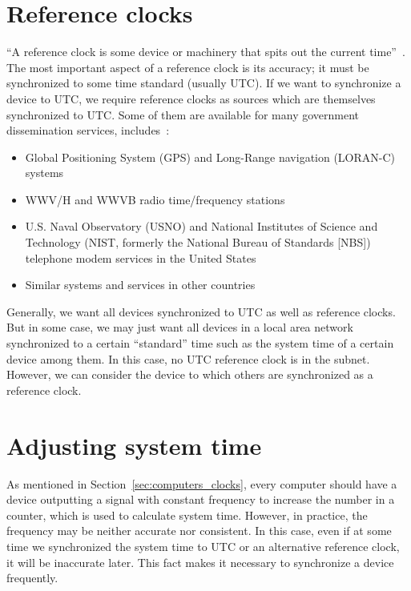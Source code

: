 \section{Reference clocks}%
\label{sec:reference_clocks}
``A reference clock is some device or machinery that spits out the current
time''~\cite{reference_clock}.
The most important aspect of a reference clock is its accuracy; it must be
synchronized to some time standard (usually UTC). If we want to synchronize a
device to UTC, we require reference clocks as sources which are themselves
synchronized to UTC\null. Some of them are
available for many government dissemination services, includes~\cite{redbook}:
\begin{itemize}
    \item Global Positioning System (GPS) and Long-Range navigation (LORAN-C)
        systems
    \item WWV/H and WWVB radio time/frequency stations
    \item U.S. Naval Observatory (USNO) and National Institutes of Science and
        Technology (NIST\null, formerly the National Bureau of Standards [NBS])
        telephone modem services in the United States
    \item Similar systems and services in other countries
\end{itemize}
Generally, we want all devices synchronized to UTC as well as reference clocks.
But in some case, we may just want all devices in a local area network
synchronized to a certain ``standard'' time such as the system time of a
certain device among them. In this case, no UTC reference clock is in the
subnet. However, we can consider the device to which others are synchronized as
a reference clock. 

\section{Adjusting system time}%
\label{sec:adjusting_system_time}
As mentioned in Section~\ref{sec:computers_clocks}, every computer should have
a device outputting a signal with constant frequency to increase the number in
a counter, which is used to calculate system time. However, in practice, the
frequency may be neither accurate nor consistent. In this case, even if at some
time we synchronized the system time to UTC or an alternative reference clock,
it will be inaccurate later. This fact makes it necessary to synchronize a
device frequently.

